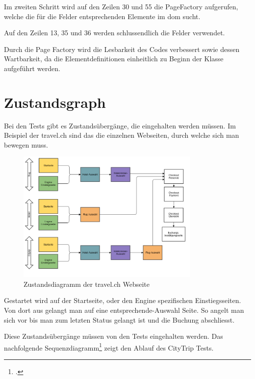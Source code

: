 Im zweiten Schritt wird auf den Zeilen 30 und 55 die PageFactory aufgerufen, welche die für die Felder entsprechenden Elemente im \gls{dom} sucht.

Auf den Zeilen 13, 35 und 36 werden schlussendlich die Felder verwendet.

Durch die Page Factory wird die Lesbarkeit des Codes verbessert sowie dessen Wartbarkeit, da die Elementdefinitionen einheitlich zu Beginn der Klasse aufgeführt werden.

\section{Zustandsgraph}
\label{sec:umsetzung:zustandsgraph}
Bei den Tests gibt es Zustandsübergänge, die eingehalten werden müssen. Im Beispiel der travel.ch sind das die einzelnen Webseiten, durch welche sich man bewegen muss. 

\begin{figure}[H]
	\centering
	\includegraphics[width=0.8\textwidth]{images/Automated Testing Ablauf2.png}
	\caption{Zustandsdiagramm der travel.ch Webseite}
	\label{fig:umsetzung:zustandsgraph}
\end{figure}

Gestartet wird auf der Startseite, oder den Engine spezifischen Einstiegsseiten. Von dort aus gelangt man auf eine entsprechende-Auswahl Seite. So angelt man sich vor bis man zum letzten Status gelangt ist und die Buchung abschliesst.

Diese Zustandsübergänge müssen von den Tests eingehalten werden. Das nachfolgende Sequenzdiagramm\footcite{sequence_diagram} zeigt den Ablauf des CityTrip Tests.

